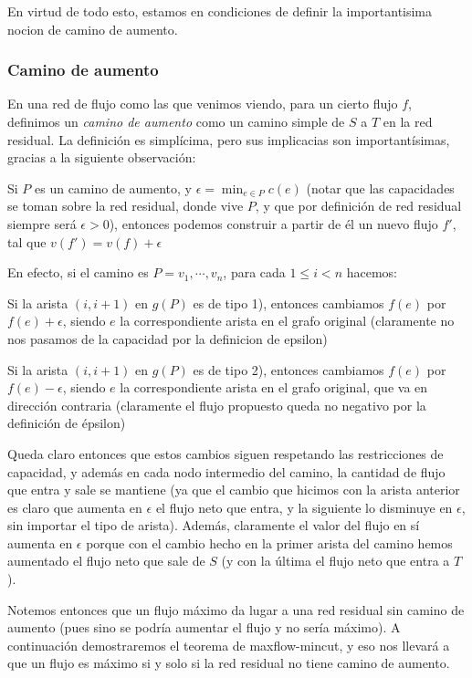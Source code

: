 \documentclass{article}
\begin{document}
En virtud de todo esto, estamos en condiciones de definir la importantisima nocion de camino de aumento.

\subsubsection{Camino de aumento}

En una red de flujo como las que venimos viendo, para un cierto flujo $f$, definimos un \textit{camino de aumento} como un camino simple de $S$ a $T$ en la red residual.
La definición es simplícima, pero sus implicacias son importantísimas, gracias a la siguiente observación:

Si $P$ es un camino de aumento, y $\epsilon = \min_{e \in P}{c(e)}$ (notar que las capacidades se toman sobre la red residual, donde vive $P$, y
que por definición de red residual siempre será $\epsilon > 0$),
entonces podemos construir a partir de él un nuevo flujo $f'$, tal que $v(f') = v(f) + \epsilon$

En efecto, si el camino es $P = v_1, \cdots, v_n$, para cada $1 \leq i < n$ hacemos:

Si la arista $(i,i+1)$ en $g(P)$ es de tipo 1), entonces cambiamos $f(e)$ por $f(e) + \epsilon$, siendo $e$ la correspondiente arista en el grafo original
(claramente no nos pasamos de la capacidad por la definicion de epsilon)

Si la arista $(i,i+1)$ en $g(P)$ es de tipo 2), entonces cambiamos $f(e)$ por $f(e) - \epsilon$, siendo $e$ la correspondiente arista en el grafo original, que va en dirección contraria (claramente el flujo propuesto queda no negativo por la definición de épsilon)

Queda claro entonces que estos cambios siguen respetando las restricciones de capacidad, y además en cada nodo intermedio del camino,
la cantidad de flujo que entra y sale se mantiene (ya que el cambio que hicimos con la arista anterior es claro que aumenta en $\epsilon$ el
flujo neto que entra, y la siguiente lo disminuye en $\epsilon$, sin importar el tipo de arista). Además, claramente el valor del flujo en
sí aumenta en $\epsilon$ porque con el cambio hecho en la primer arista del camino hemos aumentado el flujo neto que sale de $S$ (y con la
última el flujo neto que entra a $T$).

Notemos entonces que un flujo máximo da lugar a una red residual sin camino de aumento (pues sino se podría aumentar el flujo y no sería máximo).
A continuación demostraremos el teorema de maxflow-mincut, y eso nos llevará a que un flujo es máximo si y solo si la red residual no tiene
camino de aumento.
\end{document}
